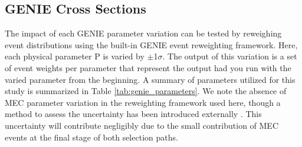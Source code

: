 \subsection{GENIE Cross Sections}
The impact of each GENIE parameter variation can be tested by reweighing event distributions using the built-in GENIE event reweighting framework. Here, each physical parameter P is varied by $\pm$1$\sigma$. The output of this variation is a set of event weights per parameter that represent the output had you run with the varied parameter from the beginning. A summary of parameters utilized for this study is summarized in Table \ref{tab:genie_parameters}. We note the absence of MEC parameter variation in the reweighting framework used here, though a method to assess the uncertainty has been introduced externally \cite{bib:jaz_datamc_agreement}.  This uncertainty will contribute negligibly due to the small contribution of MEC events at the final stage of both selection paths.

